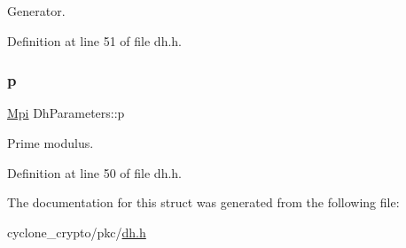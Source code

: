 Generator. 



Definition at line 51 of file dh.\+h.

\mbox{\label{structDhParameters_ae39a6a92b952ae9c49c66c5c9c131a3b}} 
\subsubsection{\texorpdfstring{p}{p}}
{\footnotesize\ttfamily \hyperlink{structMpi}{Mpi} Dh\+Parameters\+::p}



Prime modulus. 



Definition at line 50 of file dh.\+h.



The documentation for this struct was generated from the following file\+:\begin{DoxyCompactItemize}
\item 
cyclone\+\_\+crypto/pkc/\hyperlink{dh_8h}{dh.\+h}\end{DoxyCompactItemize}
